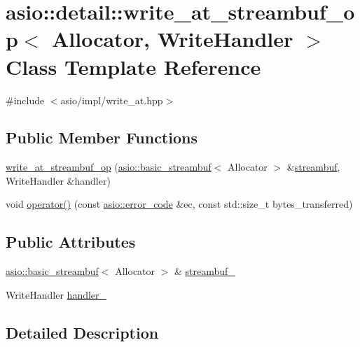 \hypertarget{classasio_1_1detail_1_1write__at__streambuf__op}{}\section{asio\+:\+:detail\+:\+:write\+\_\+at\+\_\+streambuf\+\_\+op$<$ Allocator, Write\+Handler $>$ Class Template Reference}
\label{classasio_1_1detail_1_1write__at__streambuf__op}


{\ttfamily \#include $<$asio/impl/write\+\_\+at.\+hpp$>$}

\subsection*{Public Member Functions}
\begin{DoxyCompactItemize}
\item 
\hyperlink{classasio_1_1detail_1_1write__at__streambuf__op_aacf12d7ef18e1bfeac6e8104557c3854}{write\+\_\+at\+\_\+streambuf\+\_\+op} (\hyperlink{classasio_1_1basic__streambuf}{asio\+::basic\+\_\+streambuf}$<$ Allocator $>$ \&\hyperlink{namespaceasio_a6a7ba348943527312eeace3492bf32ee}{streambuf}, Write\+Handler \&handler)
\item 
void \hyperlink{classasio_1_1detail_1_1write__at__streambuf__op_a0bac25acb1ea3a04fd710a7965c29f63}{operator()} (const \hyperlink{classasio_1_1error__code}{asio\+::error\+\_\+code} \&ec, const std\+::size\+\_\+t bytes\+\_\+transferred)
\end{DoxyCompactItemize}
\subsection*{Public Attributes}
\begin{DoxyCompactItemize}
\item 
\hyperlink{classasio_1_1basic__streambuf}{asio\+::basic\+\_\+streambuf}$<$ Allocator $>$ \& \hyperlink{classasio_1_1detail_1_1write__at__streambuf__op_a888b8cc4dc6b6b5ad8c6f08431807f59}{streambuf\+\_\+}
\item 
Write\+Handler \hyperlink{classasio_1_1detail_1_1write__at__streambuf__op_a3a22292265e05086dd362a791578be20}{handler\+\_\+}
\end{DoxyCompactItemize}


\subsection{Detailed Description}
